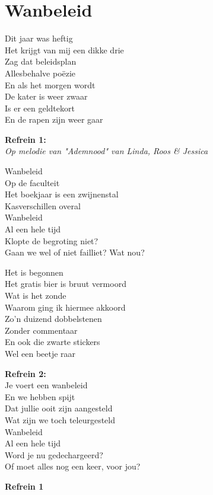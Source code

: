 \section{Wanbeleid}
Dit jaar was heftig\\
Het krijgt van mij een dikke drie\\
Zag dat beleidsplan\\
Allesbehalve poëzie\\
En als het morgen wordt\\
De kater is weer zwaar\\
Is er een geldtekort\\
En de rapen zijn weer gaar

\textbf{Refrein 1:}\\
\textit{Op melodie van "Ademnood" van Linda, Roos \& Jessica}

Wanbeleid\\
Op de faculteit\\
Het boekjaar is een zwijnenstal\\
Kasverschillen overal\\
Wanbeleid\\
Al een hele tijd\\
Klopte de begroting niet?\\
Gaan we wel of niet failliet? Wat nou?

Het is begonnen\\
Het gratis bier is bruut vermoord\\
Wat is het zonde\\
Waarom ging ik hiermee akkoord\\
Zo'n duizend dobbelstenen\\
Zonder commentaar\\
En ook die zwarte stickers\\
Wel een beetje raar

\textbf{Refrein 2:}\\
Je voert een wanbeleid\\
En we hebben spijt\\
Dat jullie ooit zijn aangesteld\\
Wat zijn we toch teleurgesteld\\
Wanbeleid\\
Al een hele tijd\\
Word je nu gedechargeerd?\\
Of moet alles nog een keer, voor jou?

\textbf{Refrein 1}
